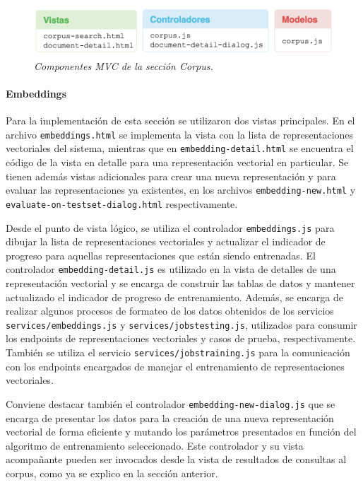 \begin{figure}[h]
    \centering
    \includegraphics[width=\textwidth]{images/ui-nabu-mvc-corpus}
    \caption{\textit{Componentes MVC de la sección Corpus.}}
    \label{fig:ui-nabu-mvc-corpus}
\end{figure}

\paragraph{Embeddings}

Para la implementación de esta sección se utilizaron dos vistas principales. En el archivo
\texttt{embeddings.html} se implementa la vista con la lista de representaciones vectoriales del sistema,
mientras que en \texttt{embedding-detail.html} se encuentra el código de la vista en detalle para una
representación vectorial en particular. Se tienen además vistas adicionales para crear una nueva representación
y para evaluar las representaciones ya existentes, en los archivos \texttt{embedding-new.html} y
\texttt{evaluate-on-testset-dialog.html} respectivamente.

Desde el punto de vista lógico, se utiliza el controlador \texttt{embeddings.js} para dibujar la lista de
representaciones vectoriales y actualizar el indicador de progreso para aquellas representaciones que están
siendo entrenadas. El controlador \texttt{embedding-detail.js} es utilizado en la vista de detalles de una
representación vectorial y se encarga de construir las tablas de datos y mantener actualizado el indicador de
progreso de entrenamiento. Además, se encarga de realizar algunos procesos de formateo de los datos obtenidos
de los servicios \texttt{services/embeddings.js} y \texttt{services/jobstesting.js}, utilizados para consumir
los endpoints de representaciones vectoriales y casos de prueba, respectivamente. También se utiliza el servicio
\texttt{services/jobstraining.js} para la comunicación con los endpoints encargados de manejar el entrenamiento
de representaciones vectoriales.

Conviene destacar también el controlador \texttt{embedding-new-dialog.js} que se encarga de presentar los
datos para la creación de una nueva representación vectorial de forma eficiente y mutando los parámetros
presentados en función del algoritmo de entrenamiento seleccionado. Este controlador y su vista acompañante
pueden ser invocados desde la vista de resultados de consultas al corpus, como ya se explico en la sección
anterior.

